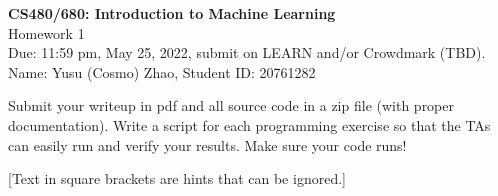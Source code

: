 \documentclass[10pt,letter,notitlepage]{article}
\newcommand{\red}[1]{{\color{red}#1}}
\newcounter{exercise}
\begin{document}
\begin{center}
  \large{\textbf{CS480/680: Introduction to Machine Learning} \\ Homework 1\\ \red{Due: 11:59 pm, May 25, 2022}, submit on LEARN and/or Crowdmark (TBD).} \\

Name: Yusu (Cosmo) Zhao, Student ID: 20761282

\end{center}

\begin{center}
Submit your writeup in pdf and all source code in a zip file (with proper documentation). Write a script for each programming exercise so that the TAs can easily run and verify your results. Make sure your code runs!

[Text in square brackets are hints that can be ignored.]
\end{center}
\end{document}
